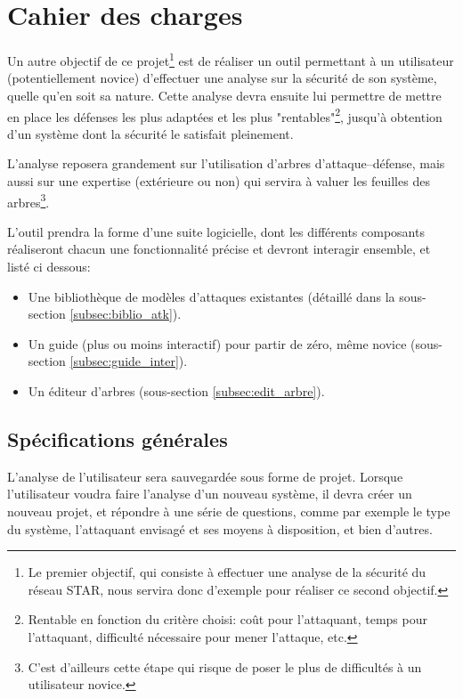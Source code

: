 \section{Cahier des charges}
    Un autre objectif de ce projet\footnote{Le premier objectif, qui consiste à effectuer une analyse de la sécurité du réseau STAR, nous servira donc d'exemple pour réaliser ce second objectif.} est de réaliser un outil permettant à un utilisateur (potentiellement novice) d'effectuer une analyse sur la sécurité de son système, quelle qu'en soit sa nature. Cette analyse devra ensuite lui permettre de mettre en place les défenses les plus adaptées et les plus "rentables"\footnote{Rentable en fonction du critère choisi: coût pour l'attaquant, temps pour l'attaquant, difficulté nécessaire pour mener l'attaque, etc.}, jusqu'à obtention d'un système dont la sécurité le satisfait pleinement.
    
    L'analyse reposera grandement sur l'utilisation d'arbres d'attaque--défense, mais aussi sur une expertise (extérieure ou non) qui servira à valuer les feuilles des arbres\footnote{C'est d'ailleurs cette étape qui risque de poser le plus de difficultés à un utilisateur novice.}.
    
    L'outil prendra la forme d'une suite logicielle, dont les différents composants réaliseront chacun une fonctionnalité précise et devront interagir ensemble, et listé ci dessous:
    \begin{itemize}
        \item Une bibliothèque de modèles d'attaques existantes (détaillé dans la sous-section \ref{subsec:biblio_atk}).
        \item Un guide (plus ou moins interactif) pour partir de zéro, même novice (sous-section \ref{subsec:guide_inter}).
        \item Un éditeur d'arbres (sous-section \ref{subsec:edit_arbre}).
    \end{itemize}

    \subsection{Spécifications générales}
        \label{subsec:spec_gen}
        L'analyse de l'utilisateur sera sauvegardée sous forme de projet. Lorsque l'utilisateur voudra faire l'analyse d'un nouveau système, il devra créer un nouveau projet, et répondre à une série de questions, comme par exemple le type du système, l'attaquant envisagé et ses moyens à disposition, et bien d'autres.
        
